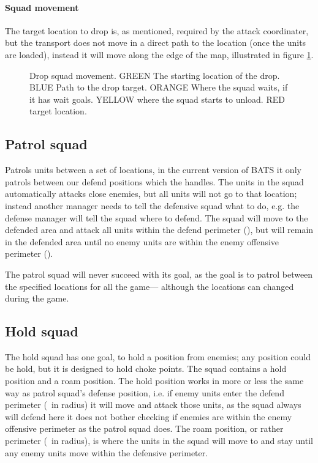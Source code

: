 
\paragraph{Squad movement}
The target location to drop is, as mentioned, required by the attack coordinater, but the transport does not move in a direct path to the location (once the units are loaded), instead it will move along the edge of the map, illustrated in figure \ref{fig:drop_squad_movement}.
\begin{figure}[htb]
\caption[Drop squad movement]{Drop squad movement. GREEN The starting location of the drop. BLUE Path to the drop target. ORANGE Where the squad waits, if it has wait goals. YELLOW where the squad starts to unload. RED target location.}
\label{fig:drop_squad_movement}
\end{figure}

\subsection{Patrol squad}
\label{sec:patrol_squad}
Patrols units between a set of locations, in the current version of BATS it only patrols between our defend positions which the  handles. The units in the squad automatically attacks close enemies, but all units will not go to that location; instead another manager needs to tell the defensive squad what to do, e.g. the defense manager will tell the squad where to defend. The squad will move to the defended area and attack all units within the defend perimeter (\squadDefendDefendPerimeter), but will remain in the defended area until no enemy units are within the enemy offensive perimeter (\squadDefendEnemyOffensivePerimeter).

The patrol squad will never succeed with its goal, as the goal is to patrol between the specified locations for all the game— although the locations can changed during the game.


\subsection{Hold squad}
\label{sec:hold_squad}
The hold squad has one goal, to hold a position from enemies; any position could be hold, but it is designed to hold choke points. The squad contains a hold position and a roam position. The hold position works in more or less the same way as patrol squad's defense position, i.e. if enemy units enter the defend perimeter (\squadDefendDefendPerimeter~in radius) it will move and attack those units, as the squad always will defend here it does not bother checking if enemies are within the enemy offensive perimeter as the patrol squad does. The roam position, or rather perimeter (\squadDefendRoamPerimeter~in radius), is where the units in the squad will move to and stay until any enemy units move within the defensive perimeter.

